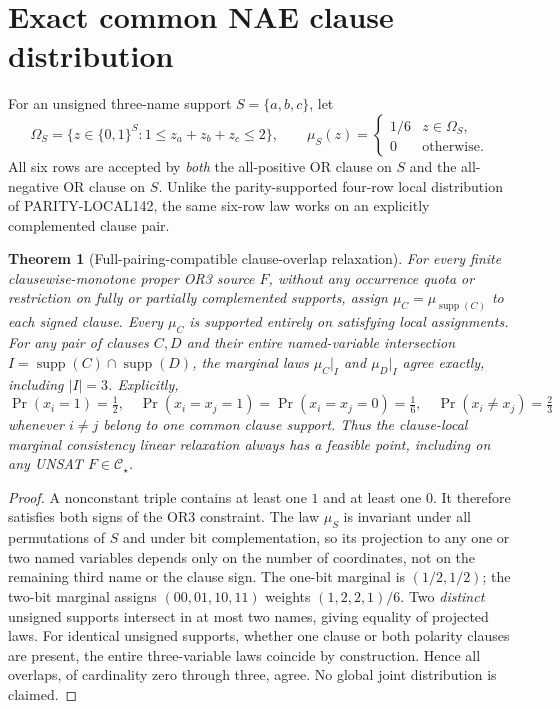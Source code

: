 \documentclass[11pt]{article}
\newtheorem{theorem}{Theorem}
\newcommand{\CS}{\mathcal C_\star}
\begin{document}
\section{Exact common NAE clause distribution}
For an unsigned three-name support $S=\{a,b,c\}$, let
\[
 \Omega_S=\{z\in\{0,1\}^{S}:1\le z_a+z_b+z_c\le2\},
 \qquad
 \mu_S(z)=\begin{cases}1/6&z\in\Omega_S,\\0&\text{otherwise.}\end{cases}
\]
All six rows are accepted by \emph{both} the all-positive OR clause on $S$ and the all-negative OR clause on $S$. Unlike the parity-supported four-row local distribution of PARITY-LOCAL142, the same six-row law works on an explicitly complemented clause pair.

\begin{theorem}[Full-pairing-compatible clause-overlap relaxation]
For \emph{every} finite clausewise-monotone proper OR3 source $F$, without any occurrence quota or restriction on fully or partially complemented supports, assign $\mu_C=\mu_{\operatorname{supp}(C)}$ to each signed clause. Every $\mu_C$ is supported entirely on satisfying local assignments. For any pair of clauses $C,D$ and their entire named-variable intersection $I=\operatorname{supp}(C)\cap\operatorname{supp}(D)$, the marginal laws $\mu_C|_I$ and $\mu_D|_I$ agree exactly, including $|I|=3$. Explicitly,
\[
 \Pr(x_i=1)=\tfrac12,\quad
 \Pr(x_i=x_j=1)=\Pr(x_i=x_j=0)=\tfrac16,\quad
 \Pr(x_i\ne x_j)=\tfrac23
\]
whenever $i\ne j$ belong to one common clause support.
Thus the \emph{clause-local marginal consistency} linear relaxation always has a feasible point, including on any UNSAT $F\in\CS$.
\end{theorem}
\begin{proof}
A nonconstant triple contains at least one $1$ and at least one $0$. It therefore satisfies both signs of the OR3 constraint. The law $\mu_S$ is invariant under all permutations of $S$ and under bit complementation, so its projection to any one or two named variables depends only on the number of coordinates, not on the remaining third name or the clause sign. The one-bit marginal is $(1/2,1/2)$; the two-bit marginal assigns $(00,01,10,11)$ weights $(1,2,2,1)/6$. Two \emph{distinct} unsigned supports intersect in at most two names, giving equality of projected laws. For identical unsigned supports, whether one clause or both polarity clauses are present, the entire three-variable laws coincide by construction. Hence all overlaps, of cardinality zero through three, agree. No global joint distribution is claimed.
\end{proof}
\end{document}
